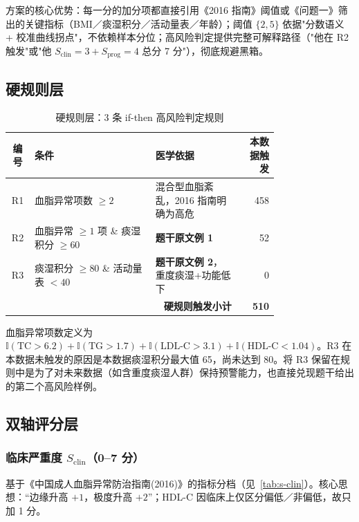\documentclass{MathorCupmodeling}
\begin{document}
方案的核心优势：每一分的加分项都直接引用《2016 指南》阈值或《问题一》筛出的关键指标（BMI／痰湿积分／活动量表／年龄）；阈值 $\{2, 5\}$ 依据"分数语义 + 校准曲线拐点"，不依赖样本分位；高风险判定提供完整可解释路径（"他在 R2 触发"或"他 $S_{\text{clin}}=3 + S_{\text{prog}}=4$ 总分 7 分"），彻底规避黑箱。

\subsection{硬规则层}\label{sec:q2-rule}

\begin{table}[H]
\centering\small
\caption{硬规则层：3 条 if-then 高风险判定规则}\label{tab:hard-rules}
\begin{tabular}{@{}c p{0.45\linewidth} p{0.32\linewidth} r@{}}
\toprule
编号 & 条件 & 医学依据 & 本数据触发 \\
\midrule
R1 & 血脂异常项数 $\ge 2$ & 混合型血脂紊乱，2016 指南明确为高危 & 458 \\
R2 & 血脂异常 $\ge 1$ 项 \& 痰湿积分 $\ge 60$ & \textbf{题干原文例 1} & 52 \\
R3 & 痰湿积分 $\ge 80$ \& 活动量表 $< 40$ & \textbf{题干原文例 2}，重度痰湿+功能低下 & 0 \\
\midrule
\multicolumn{3}{r}{\textbf{硬规则触发小计}} & \textbf{510} \\
\bottomrule
\end{tabular}
\end{table}

血脂异常项数定义为 $\mathbb{I}(\text{TC}>6.2) + \mathbb{I}(\text{TG}>1.7) + \mathbb{I}(\text{LDL-C}>3.1) + \mathbb{I}(\text{HDL-C}<1.04)$。R3 在本数据未触发的原因是本数据痰湿积分最大值 65，尚未达到 80。将 R3 保留在规则中是为了对未来数据（如含重度痰湿人群）保持预警能力，也直接兑现题干给出的第二个高风险样例。

\subsection{双轴评分层}\label{sec:q2-score}

\subsubsection{\texorpdfstring{临床严重度 $S_{\text{clin}}$（0--7 分）}{临床严重度 S\_clin}}

基于《中国成人血脂异常防治指南(2016)》的指标分档（见~\cref{tab:s-clin}）。核心思想：``边缘升高 $+1$，极度升高 $+2$''；HDL-C 因临床上仅区分偏低／非偏低，故只加 1 分。
\end{document}
